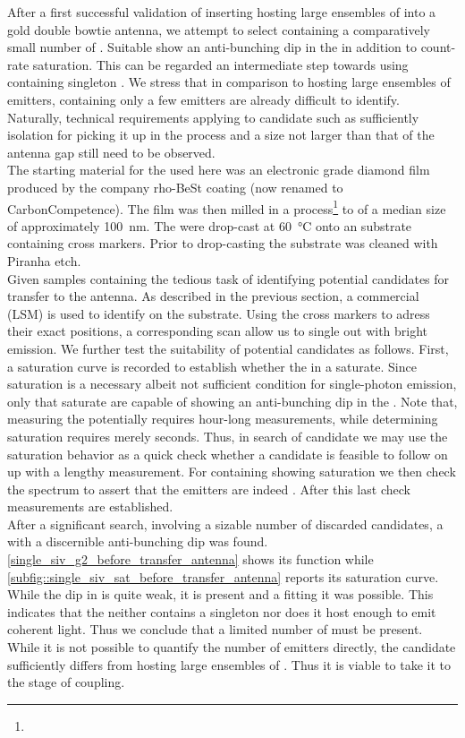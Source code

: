 				After a first successful validation of inserting \nds hosting large ensembles of \sivs into a gold double bowtie antenna, we attempt to select \nds containing a comparatively small number of \sivs. Suitable \nds show an anti-bunching dip in the \gtf in addition to count-rate saturation. This can be regarded an intermediate step towards using \nds containing singleton \sivs. We stress that in comparison to \nds hosting large ensembles of emitters, \nds containing only a few emitters are already difficult to identify. Naturally, technical requirements applying to candidate \nds such as sufficiently isolation for picking it up in the \pp process and a size not larger than that of the antenna gap still need to be observed.
				\\
				The starting material for the \nds used here was an electronic grade diamond film produced by the company rho-BeSt coating (now renamed to CarbonCompetence).
				The film was then milled in a \basd process\footnote{\krueger} to \nds of a median size of approximately \SI{100}{nm}.
				The \nds were drop-cast at \SI{60}{\celsius} onto an \ir substrate containing cross markers. Prior to drop-casting the substrate was cleaned with Piranha etch.
				\\
				Given samples containing \nds the tedious task of identifying potential candidates for transfer to the antenna. As described in the previous section, a commercial \lsm (LSM) is used to identify \nds on the substrate. Using the cross markers to adress their exact positions, a corresponding \fl scan allow us to single out \nds with bright emission. We further test the suitability of potential candidates as follows. First, a saturation curve is recorded to establish whether the \sivs in a \nd saturate. Since saturation is a necessary albeit not sufficient condition for single-photon emission, only \nds that saturate are capable of showing an anti-bunching dip in the \gtf. Note that, measuring the \gtf potentially requires hour-long measurements, while determining saturation requires merely seconds. Thus, in search of candidate \nds we may use the saturation behavior as a quick check whether a candidate is feasible to follow on up with a lengthy \gtf measurement. For \nds containing \sivs showing saturation we then check the spectrum to assert that the emitters are indeed \sivs. After this last check \gtf measurements are established.
				\\
				After a significant search, involving a sizable number of discarded candidates, a \nd with a discernible anti-bunching dip was found. \autoref{single_siv_g2_before_transfer_antenna} shows its \gtf function while \autoref{subfig::single_siv_sat_before_transfer_antenna} reports its saturation curve. While the dip in \gtf is quite weak, it is present and a fitting it was possible. This indicates that the \nd neither contains a singleton \siv nor does it host enough \sivs to emit coherent light. Thus we conclude that a limited number of \sivs must be present. While it is not possible to quantify the number of emitters directly, the candidate sufficiently differs from \nds hosting large ensembles of \sivs. Thus it is viable to take it to the stage of coupling.

